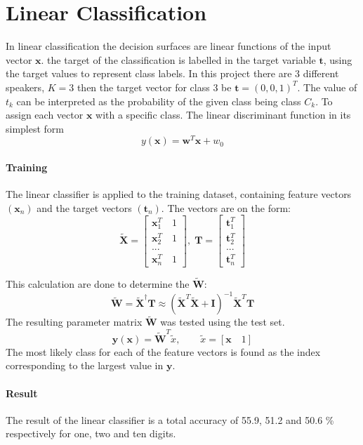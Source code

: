 \section*{Linear Classification}
In linear classification the decision surfaces are linear functions of the input vector $\mathbf{x}$.
the target of the classification is labelled in the target variable $\mathbf{t}$, using the target values to represent class labels.
In this project there are 3 different speakers, $K = 3$ then the target vector for class 3 be $\mathbf{t} = (0, 0, 1)^T$.
The value of $t_k$ can be interpreted as the probability of the given class being class $C_k$.
To assign each vector $\mathbf{x}$ with a specific class.
The linear discriminant function in its simplest form
\begin{equation}
y(\mathbf{x}) = \mathbf{w}^T \mathbf{x}+w_0
\label{eq:lin_output}
\end{equation}

\paragraph*{Training}
The linear classifier is applied to the training dataset, containing feature vectors $(\mathbf{x}_n)$ and the target vectors $(\mathbf{t}_n)$.
The vectors are on the form:
\begin{equation}
\mathbf{\tilde{X}}=\left[ \begin{array}{c}\mathbf{x}_1^T \quad 1\\
\mathbf{x}_2^T \quad 1\\
...\\ 
\mathbf{x}_n^T \quad 1 \end{array} \right],
\;
\mathbf{T}=\left[ \begin{array}{c}
\mathbf{t}_1^T\\ 
\mathbf{t}_2^T\\ 
...\\
\mathbf{t}_n^T
\end{array} \right]
\label{eq:linearVectors}  
\end{equation} 

This calculation are done to determine the $\tilde{\mathbf{W}}$:
\begin{equation}
\tilde{\mathbf{W}} = \tilde{\mathbf{X}}^\dagger \mathbf{T} \approx  (\tilde{\mathbf{X}}^T \tilde{\mathbf{X}}+\mathbf{I})^{-1} \tilde{\mathbf{X}}^T\mathbf{T}
\label{eq:weightVector}  
\end{equation}
The resulting parameter matrix $ \tilde{\mathbf{W}} $ was tested using the test set.
\begin{equation}
\mathbf{y}(\mathbf{x})=\tilde{\mathbf{W}}^T \tilde{x}, \qquad \tilde{x}= \left[ 
\mathbf{x} \quad 1 
\right]
\end{equation}
The most likely class for each of the feature vectors is found as the index corresponding to the largest value in $ \mathbf{y} $.
\paragraph*{Result}
The result of the linear classifier is a total accuracy of 55.9, 51.2 and 50.6 \% respectively for one, two and ten digits. 

